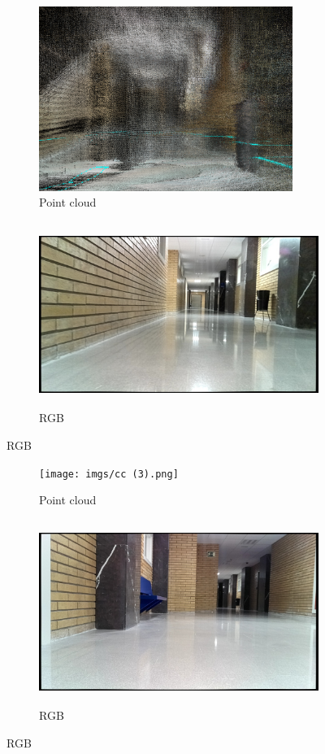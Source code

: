 \begin{figure}[H]
  \centering
  \begin{subfigure}[b]{0.47\textwidth}
    \centering
    \includegraphics[height=6cm,width=\textwidth]{imgs/cc (4).png}
    \caption{Point cloud}

  \end{subfigure}
  \hfill
  \begin{subfigure}[b]{0.47\textwidth}
    \centering
    \includegraphics[height=6cm,width=\textwidth]{imgs/cr4.jpg}
    \caption{RGB}

  \end{subfigure}
\end{figure}

\begin{figure}[H]
  \centering
  \begin{subfigure}[b]{0.47\textwidth}
    \centering
    \texttt{[image: imgs/cc (3).png]}
    \caption{Point cloud}

  \end{subfigure}
  \hfill
  \begin{subfigure}[b]{0.47\textwidth}
    \centering
    \includegraphics[height=6cm,width=\textwidth]{imgs/cr3.jpg}
    \caption{RGB}

  \end{subfigure}
\end{figure}